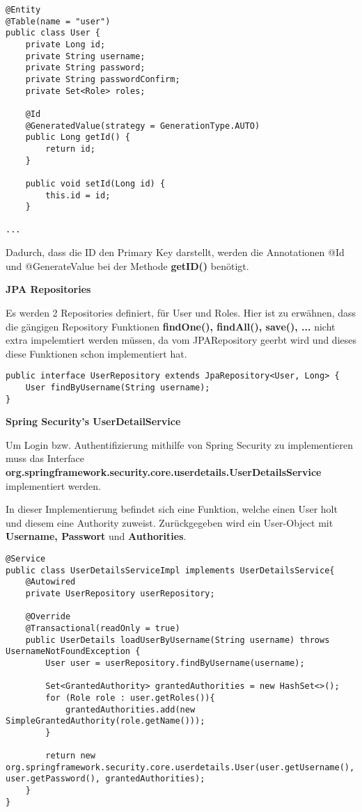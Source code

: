 \begin{lstlisting}[style=Java]
@Entity
@Table(name = "user")
public class User {
	private Long id;
	private String username;
	private String password;
	private String passwordConfirm;
	private Set<Role> roles;

	@Id
	@GeneratedValue(strategy = GenerationType.AUTO)
	public Long getId() {
		return id;
	}

	public void setId(Long id) {
		this.id = id;
	}

...
\end{lstlisting}

Dadurch, dass die ID den Primary Key darstellt, werden die Annotationen @Id und @GenerateValue bei der Methode \textbf{getID()} benötigt.

\clearpage

\item \textbf{JPA Repositories}

Es werden 2 Repositories definiert, für User und Roles. Hier ist zu erwähnen, dass die gängigen Repository Funktionen \textbf{findOne(), findAll(), save(), ...} nicht extra impelemtiert werden müssen, da vom JPARepository geerbt wird und dieses diese Funktionen schon implementiert hat.

\begin{lstlisting}[style=Java]
public interface UserRepository extends JpaRepository<User, Long> {
	User findByUsername(String username);
}
\end{lstlisting}

\item \textbf{Spring Security's UserDetailService}

Um Login bzw. Authentifizierung mithilfe von Spring Security zu implementieren muss das Interface \textbf{org.springframework.security.core.userdetails.UserDetailsService} implementiert werden.

In dieser Implementierung befindet sich eine Funktion, welche einen User holt und diesem eine Authority zuweist. Zurückgegeben wird ein User-Object mit \textbf{Username, Passwort} und \textbf{Authorities}.

\begin{lstlisting}[style=Java]
@Service
public class UserDetailsServiceImpl implements UserDetailsService{
	@Autowired
	private UserRepository userRepository;

	@Override
	@Transactional(readOnly = true)
	public UserDetails loadUserByUsername(String username) throws UsernameNotFoundException {
		User user = userRepository.findByUsername(username);

		Set<GrantedAuthority> grantedAuthorities = new HashSet<>();
		for (Role role : user.getRoles()){
			grantedAuthorities.add(new SimpleGrantedAuthority(role.getName()));
		}

		return new org.springframework.security.core.userdetails.User(user.getUsername(), user.getPassword(), grantedAuthorities);
	}
}
\end{lstlisting}

